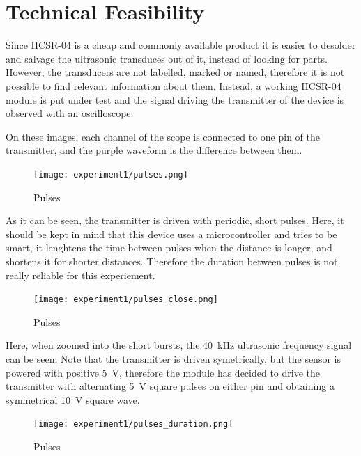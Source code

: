 \documentclass[12pt, a4paper]{article}
\begin{document}
    \section{Technical Feasibility}

        Since HCSR-04 is a cheap and commonly available product it is easier to desolder and salvage the ultrasonic transduces out of it, instead of looking for parts. However, the transducers are not labelled, marked or named, therefore it is not possible to find relevant information about them. Instead, a working HCSR-04 module is put under test and the signal driving the transmitter of the device is observed with an oscilloscope. 

        \noindent On these images, each channel of the scope is connected to one pin of the transmitter, and the purple waveform is the difference between them.

        \begin{figure}[H]\centering
            \texttt{[image: experiment1/pulses.png]}
            \caption[]{Pulses}\label{fig:pulses}
        \end{figure}

        \noindent As it can be seen, the transmitter is driven with periodic, short pulses. Here, it should be kept in mind that this device uses a microcontroller and tries to be smart, it lenghtens the time between pulses when the distance is longer, and shortens it for shorter distances. Therefore the duration between pulses is not really reliable for this experiement. 

        \begin{figure}[H]\centering
            \texttt{[image: experiment1/pulses\_close.png]}
            \caption[]{Pulses}\label{fig:pulses}
        \end{figure}

        \noindent Here, when zoomed into the short bursts, the \SI{40}{\kilo\hertz} ultrasonic frequency signal can be seen. Note that the transmitter is driven symetrically, but the sensor is powered with positive \SI{5}{\volt}, therefore the module has decided to drive the transmitter with alternating \SI{5}{\volt} square pulses on either pin and obtaining a symmetrical \SI{10}{\volt} square wave. 

        \begin{figure}[H]\centering
            \texttt{[image: experiment1/pulses\_duration.png]}
            \caption[]{Pulses}\label{fig:pulses}
        \end{figure}
\end{document}
